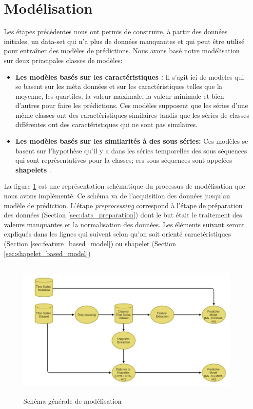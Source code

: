 \section{Modélisation}
Les étapes précédentes nous ont permis de construire, à partir des données initiales, un data-set qui n'a plus de données manquantes et qui peut être utilisé pour entraîner des modèles de prédictions. Nous avons basé notre modélisation sur deux principales classes de modèles:
\begin{itemize}
    \item \textbf{Les modèles basés sur les caractéristiques :} Il s'agit ici de modèles qui se basent sur les méta données et sur les caractéristiques telles que la moyenne, les quartiles, la valeur maximale, la valeur minimale et bien d'autres pour faire les prédictions. Ces modèles supposent que les séries d'une même classes ont des caractéristiques similaires tandis que les séries de classes différentes ont des caractéristiques qui ne sont pas similaires.
    \item \textbf{Les modèles basés sur les similarités à des sous séries:} Ces modèles se basent sur l'hypothèse qu'il y a dans les séries temporelles des sous séquences qui sont représentatives pour la classes; ces sous-séquences sont appelées \textbf{shapelets} \citep{ye2009time}.
\end{itemize}
La figure \ref{fig:modeling_shema} est une représentation schématique du processus de modélisation que nous avons implémenté. Ce schéma va de l'acquisition des données jusqu'au modèle de prédiction. L'étape \textit{preprocessing} correspond à l'étape de préparation des données (Section \ref{sec:data_preparation}) dont le but était le traitement des valeurs manquantes et la normalisation des données. Les éléments suivant seront expliqués dans les lignes qui suivent selon qu'on soit orienté caractéristiques (Section \ref{sec:feature_based_model}) ou shapelet (Section \ref{sec:shapelet_based_model})

\begin{figure}[!h]
    \centering
    \includegraphics[width=12cm,height=7cm]{report/figures/modeling-schema.jpg}
    \caption{Schéma générale de modélisation}
    \label{fig:modeling_shema}
\end{figure}

